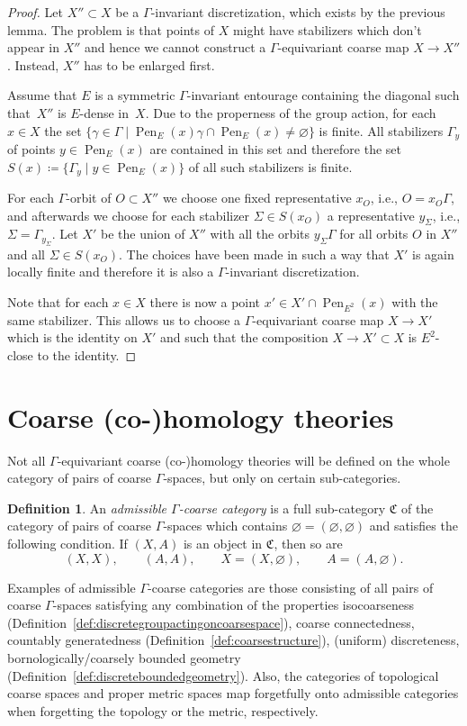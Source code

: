 \documentclass[pdftex]{sigma}
\numberwithin{equation}{section}
\theoremstyle{definition}
\newtheorem{defn}[thm]{Definition}
\DeclareMathOperator{\Pen}{Pen}
\newcommand{\admissible}{{\mathfrak{C}}}
\begin{document}
\begin{proof}
Let $X''\subset X$ be a $\Gamma$-invariant discretization, which exists by the previous lemma.
The problem is that points of $X$ might have stabilizers which don't appear in $X''$ and hence we cannot construct a $\Gamma$-equivariant coarse map $X\to X''$. Instead, $X''$ has to be enlarged first.

Assume that $E$ is a symmetric $\Gamma$-invariant entourage containing the diagonal such that~$X''$ is $E$-dense in~$X$. Due to the properness of the group action, for each $x\in X$ the set $\{\gamma\in\Gamma\mid \Pen_E(x)\gamma\cap\Pen_E(x)\not=\varnothing\}$ is finite. All stabilizers $\Gamma_{y}$ of points $y\in\Pen_E(x)$ are contained in this set and therefore the set $S(x)\coloneqq\{\Gamma_y\mid y\in\Pen_E(x)\}$ of all such stabilizers is finite.

For each $\Gamma$-orbit of $O\subset X''$ we choose one fixed representative $x_O$, i.e., $O=x_O\Gamma$, and afterwards we choose for each stabilizer $\Sigma\in S(x_O)$ a representative $y_\Sigma$, i.e., $\Sigma=\Gamma_{y_\Sigma}$. Let $X'$ be the union of $X''$ with all the orbits $y_\Sigma\Gamma$ for all orbits $O$ in $X''$ and all $\Sigma\in S(x_O)$. The choices have been made in such a way that $X'$ is again locally finite and therefore it is also a $\Gamma$-invariant discretization.

Note that for each $x\in X$ there is now a point $x'\in X'\cap \Pen_{E^2}(x)$ with the same stabilizer. This allows us to choose a $\Gamma$-equivariant coarse map $X\to X'$ which is the identity on $X'$ and such that the composition $X\to X'\subset X$ is $E^2$-close to the identity.
\end{proof}

\section{Coarse (co-)homology theories}
\label{sec:CoarseCoHomologyTheories}

Not all $\Gamma$-equivariant coarse \mbox{(co-)}homology theories will be defined on the whole category of pairs of coarse $\Gamma$-spaces, but only on certain sub-categories.
\begin{defn}\label{def:admissibleCAT}
An \emph{admissible $\Gamma$-coarse category} is a full sub-category $\admissible$ of the category of pairs of coarse $\Gamma$-spaces which contains $\varnothing=(\varnothing,\varnothing)$ and satisfies the following condition. If $(X,A)$ is an object in $\admissible$, then so are
\[
(X,X),\qquad (A,A),\qquad X=(X,\varnothing),\qquad A=(A,\varnothing).
\]
\end{defn}
Examples of admissible $\Gamma$-coarse categories are those consisting of all pairs of coarse $\Gamma$-spaces satisfying any combination of the properties isocoarseness (Definition~\ref{def:discretegroupactingoncoarsespace}), coarse connectedness, countably generatedness (Definition~\ref{def:coarsestructure}), (uniform) discreteness, bornologically/coarsely bounded geometry (Definition~\ref{def:discreteboundedgeometry}). Also, the categories of topological coarse spaces and proper metric spaces map forgetfully onto admissible categories when forgetting the topology or the metric, respectively.
\end{document}
